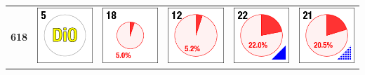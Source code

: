 \begin{table}
\begin{center}
\begin{tabular}{cccccc}
\textbf{618} & \includegraphics{./images/ace_m2_sample_tiles/sample05.png} & \includegraphics{./images/ace_m2_sample_tiles/sample18.png} & \includegraphics{./images/ace_m2_sample_tiles/sample12.png} & \includegraphics{./images/ace_m2_sample_tiles/sample22.png} & \includegraphics{./images/ace_m2_sample_tiles/sample21.png}\\

\end{tabular}
\end{center}
\end{table}
